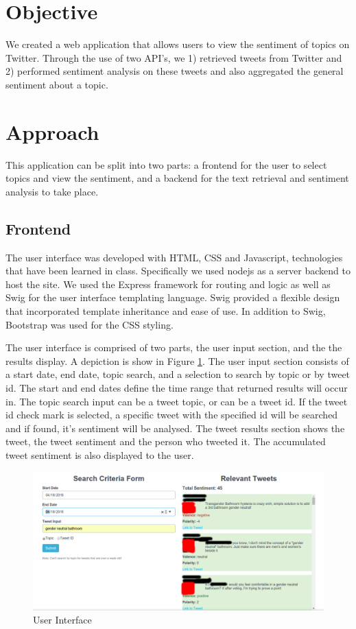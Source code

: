 \section{Objective}
We created a web application that allows users to view the sentiment of topics on Twitter. Through the use of two API’s, we 1) retrieved tweets from Twitter and 2) performed sentiment analysis on these tweets and also aggregated the general sentiment about a topic. 

\section{Approach}
This application can be split into two parts: a frontend for the user to select topics and view the sentiment, and a backend for the text retrieval and sentiment analysis to take place. 

\subsection{Frontend}
The user interface was developed with HTML, CSS and Javascript, technologies that have been learned in class. Specifically we used nodejs as a server backend to host the site. We used the Express framework for routing and logic as well as Swig for the user interface templating language. Swig provided a flexible design that incorporated template inheritance and ease of use. In addition to Swig, Bootstrap was used for the CSS styling. 

The user interface is comprised of two parts, the user input section, and the  the results display. A depiction is show in Figure \ref{fig:ui}. The user input section consists of a start date, end date, topic search, and a selection to search by topic or by tweet id. The start and end dates define the time range that returned results will occur in. The topic search input can be a tweet topic, or can be a tweet id. If the tweet id check mark is selected, a specific tweet with the specified id will be searched and if found, it's sentiment will be analysed. The tweet results section shows the tweet, the tweet sentiment and the person who tweeted it. The accumulated tweet sentiment is also displayed to the user. 

\begin{figure}[t!]
\includegraphics[width=\textwidth,scale=0.5]{fig/ui.png}
\caption{User Interface}
\label{fig:ui}
\end{figure}

